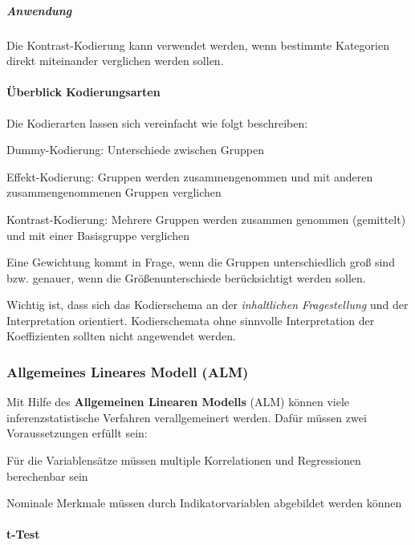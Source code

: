 \documentclass{article}
\numberwithin{equation}{section}
\begin{document}
\subparagraph{Anwendung}

Die Kontrast-Kodierung kann verwendet werden, wenn bestimmte Kategorien direkt miteinander verglichen werden sollen.

\paragraph{Überblick Kodierungsarten}

Die Kodierarten lassen sich vereinfacht wie folgt beschreiben:

\begin{compactitem}
\item Dummy-Kodierung: Unterschiede zwischen Gruppen
\item Effekt-Kodierung: Gruppen werden zusammengenommen und mit anderen zusammengenommenen Gruppen verglichen
\item Kontrast-Kodierung: Mehrere Gruppen werden zusammen genommen (gemittelt) und mit einer Basisgruppe verglichen
\end{compactitem}

Eine Gewichtung kommt in Frage, wenn die Gruppen unterschiedlich groß sind bzw. genauer, wenn die Größenunterschiede berücksichtigt werden sollen.

Wichtig ist, dass sich das Kodierschema an der \emph{inhaltlichen Fragestellung} und der Interpretation orientiert. Kodierschemata ohne sinnvolle Interpretation der Koeffizienten sollten nicht angewendet werden.

\subsubsection{Allgemeines Lineares Modell (ALM)}

Mit Hilfe des \textbf{Allgemeinen Linearen Modells} (ALM) können viele inferenzstatistische Verfahren verallgemeinert werden. Dafür müssen zwei Voraussetzungen erfüllt sein:

\begin{compactitem}
\item Für die Variablensätze müssen multiple Korrelationen und Regressionen berechenbar sein
\item Nominale Merkmale müssen durch Indikatorvariablen abgebildet werden können
\end{compactitem}

\paragraph{t-Test}
\end{document}
